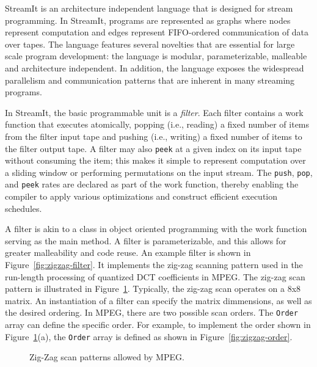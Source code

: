 \label{sec:streamit}

StreamIt  is   an  architecture independent language that is
designed for  stream programming. In StreamIt, programs are
represented as graphs where  nodes represent  computation and edges
represent FIFO-ordered communication of data over tapes.
The language features several novelties that are essential
for large scale program development: the language is modular,
parameterizable, malleable and architecture independent. In addition,
the language exposes the widespread parallelism and communication
patterns that are inherent in many streaming programs.

In  StreamIt, the  basic programmable  unit is a {\it filter}.   Each
filter contains  a work  function that executes atomically,  popping
(i.e., reading)  a fixed number  of items  from the  filter input tape
and pushing (i.e., writing) a fixed number of items to the filter
output tape.  A filter  may also {\tt peek} at a given index on its
input tape without  consuming  the  item;  this makes  it simple  to
represent computation over a sliding window or performing permutations
on the input stream.   The {\tt push}, {\tt pop}, and {\tt peek} rates
are declared as part of  the work  function,  thereby enabling  the
compiler  to apply various optimizations and construct efficient
execution schedules. 

A filter is akin to a class in object oriented programming with the
work function serving as the main method. A filter is parameterizable,
and this allows for greater malleability and code reuse.  An example
filter is shown in Figure~\ref{fig:zigzag-filter}. It implements the
zig-zag scanning pattern used in the run-length processing of
quantized DCT coefficients in MPEG. The zig-zag scan pattern is
illustrated in Figure~\ref{fig:zigzag}. Typically, the zig-zag scan
operates on a 8x8 matrix. An instantiation of a filter can specify the
matrix dimmensions, as well as the desired ordering. In MPEG, there
are two possible scan orders. The {\tt Order} array can define the
specific order. For example, to implement the order shown in
Figure~\ref{fig:zigzag}(a), the {\tt Order} array is defined as shown
in Figure~\ref{fig:zigzag-order}.

\begin{figure}[t]
\begin{center}
\vspace{-12pt}
 \caption{Zig-Zag scan patterns allowed by MPEG.}
 \label{fig:zigzag}
\end{center}
\end{figure}

